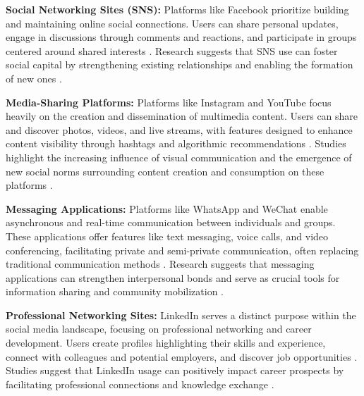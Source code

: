 \textbf{Social Networking Sites (SNS):} Platforms like Facebook prioritize building and maintaining online social connections. Users can share personal updates, engage in discussions through comments and reactions, and participate in groups centered around shared interests \cite{segesten22}. Research suggests that SNS use can foster social capital by strengthening existing relationships and enabling the formation of new ones \cite{yoon14}.

\textbf{Media-Sharing Platforms:} Platforms like Instagram and YouTube focus heavily on the creation and dissemination of multimedia content. Users can share and discover photos, videos, and live streams, with features designed to enhance content visibility through hashtags and algorithmic recommendations \cite{rogers21}. Studies highlight the increasing influence of visual communication and the emergence of new social norms surrounding content creation and consumption on these platforms \cite{lu24}.

\textbf{Messaging Applications:} Platforms like WhatsApp and WeChat enable asynchronous and real-time communication between individuals and groups. These applications offer features like text messaging, voice calls, and video conferencing, facilitating private and semi-private communication, often replacing traditional communication methods \cite{lenhart15}. Research suggests that messaging applications can strengthen interpersonal bonds and serve as crucial tools for information sharing and community mobilization \cite{pang20}.

\textbf{Professional Networking Sites:} LinkedIn serves a distinct purpose within the social media landscape, focusing on professional networking and career development. Users create profiles highlighting their skills and experience, connect with colleagues and potential employers, and discover job opportunities \cite{ellison07}. Studies suggest that LinkedIn usage can positively impact career prospects by facilitating professional connections and knowledge exchange \cite{davis20}.

